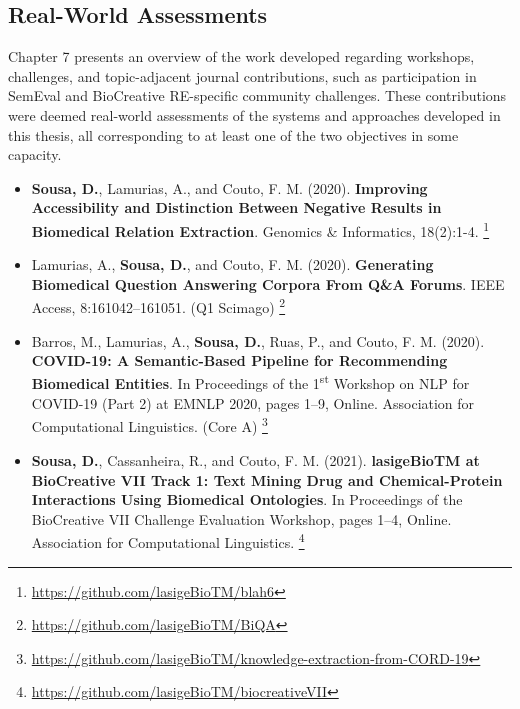 \subsection{Real-World Assessments}

Chapter 7 presents an overview of the work developed regarding workshops, challenges, and topic-adjacent journal contributions, such as participation in SemEval and BioCreative RE-specific community challenges. These contributions were deemed real-world assessments of the systems and approaches developed in this thesis, all corresponding to at least one of the two objectives in some capacity. 

\begin{itemize}
    \item{\textbf{Sousa, D.}, Lamurias, A., and Couto, F. M. (2020). \textbf{Improving Accessibility and Distinction Between Negative Results in Biomedical Relation Extraction}. Genomics \& Informatics, 18(2):1-4. \citep{sousa2020improving}} \footnote{\url{https://github.com/lasigeBioTM/blah6}}
\end{itemize}

\begin{itemize}
    \item{Lamurias, A., \textbf{Sousa, D.}, and Couto, F. M. (2020). \textbf{Generating Biomedical Question Answering Corpora From Q\&A Forums}. IEEE Access, 8:161042–161051. (Q1 Scimago) \citep{lamurias2020generating}} \footnote{\url{https://github.com/lasigeBioTM/BiQA}}
\end{itemize}

\begin{itemize}
    \item{Barros, M., Lamurias, A., \textbf{Sousa, D.}, Ruas, P., and Couto, F. M. (2020). \textbf{COVID-19: A Semantic-Based Pipeline for Recommending Biomedical Entities}. In Proceedings of the 1\textsuperscript{st} Workshop on NLP for COVID-19 (Part 2) at EMNLP 2020, pages 1–9, Online. Association for Computational Linguistics. (Core A) \citep{barros2020covid}} \footnote{\url{https://github.com/lasigeBioTM/knowledge-extraction-from-CORD-19}}
\end{itemize}

\begin{itemize}
    \item{\textbf{Sousa, D.}, Cassanheira, R., and Couto, F. M. (2021). \textbf{lasigeBioTM at BioCreative VII Track 1: Text Mining Drug and Chemical-Protein Interactions Using Biomedical Ontologies}. In Proceedings of the BioCreative VII Challenge Evaluation Workshop, pages 1–4, Online. Association for Computational Linguistics. \citep{sousalasigebiotm}} \footnote{\url{https://github.com/lasigeBioTM/biocreativeVII}}
\end{itemize}

